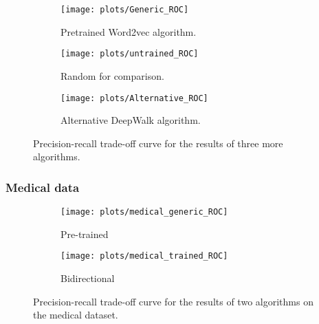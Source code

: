 \documentclass{article}
\begin{document}
  \begin{figure}[H]
   \centering
  
 \begin{subfigure}{.3\textwidth}
   \centering
   \texttt{[image: plots/Generic\_ROC]}
   \caption[Precision-recall curve pre-trained mice]{Pretrained Word2vec algorithm.}
   \label{ROC_generic}
   \end{subfigure}
 \begin{subfigure}{.3\textwidth}
   \centering\texttt{[image: plots/untrained\_ROC]}
   \caption[Precision-recall curve untrained mice]{Random for comparison.}
   \label{ROC_untrained}
  \end{subfigure}
 \begin{subfigure}{.3\textwidth}
   \centering
   \texttt{[image: plots/Alternative\_ROC]}
   \caption[Precision-recall curve DeepWalk mice]{Alternative DeepWalk algorithm.}
   \label{ROC_alternative}
  \end{subfigure}
  \caption[Three more precision-recall curves]{Precision-recall trade-off curve for the results of three more algorithms.}
  \end{figure}
   \subsubsection{Medical data}
   
  \begin{figure}
    \begin{subfigure}{.45\textwidth}
   \centering\texttt{[image: plots/medical\_generic\_ROC]}
   \caption[Precision-recall curve pre-trained medical]{Pre-trained}
   \label{ROC_pretrained_medical}
  \end{subfigure}
 \begin{subfigure}{.45\textwidth}
   \centering
   \texttt{[image: plots/medical\_trained\_ROC]}
   \caption[Precision-recall curve trained medical]{Bidirectional}
   \label{ROC_trained_medical}
  \end{subfigure}
  \caption[Medical precision-recall curves]{Precision-recall trade-off curve for the results of two algorithms on the medical dataset.}
  \end{figure}
  
\end{document}
